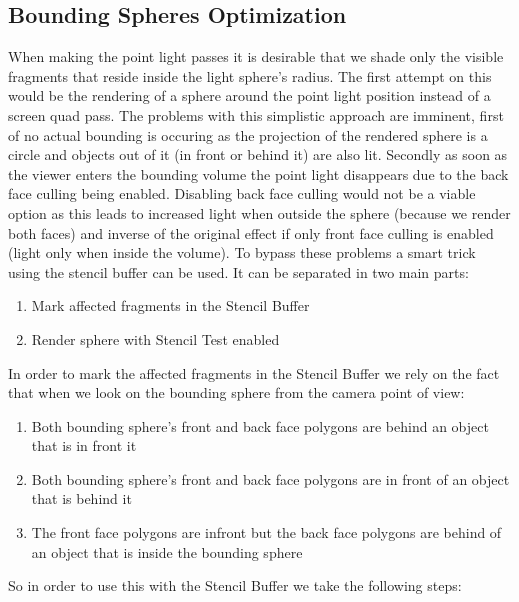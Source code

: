 \subsection{Bounding Spheres Optimization}

When making the point light passes it is desirable that we shade only the visible fragments that reside inside the light
sphere's radius. The first attempt on this would be the rendering of a sphere around the point light position instead
of a screen quad pass. The problems with this simplistic approach are imminent, first of no actual bounding is occuring
as the projection of the rendered sphere is a circle and objects out of it (in front or behind it) are also lit.
Secondly as soon as the viewer enters the bounding volume the point light disappears due to the back face culling
being enabled. Disabling back face culling would not be a viable option as this leads to increased light when outside
the sphere (because we render both faces) and inverse of the original effect if only front face culling is enabled (light
only when inside the volume).
To bypass these problems a smart trick using the stencil buffer can be used. It can be separated in two main parts:
\begin{enumerate}
    \item Mark affected fragments in the Stencil Buffer
    \item Render sphere with Stencil Test enabled
\end{enumerate}
In order to mark the affected fragments in the Stencil Buffer we rely on the fact that when we look on the bounding
sphere from the camera point of view:
\begin{enumerate}
    \item Both bounding sphere's front and back face polygons are behind an object that is in front it
    \item Both bounding sphere's front and back face polygons are in front of an object that is behind it
    \item The front face polygons are infront but the back face polygons are behind of an object that is inside the bounding sphere
\end{enumerate}
So in order to use this with the Stencil Buffer we take the following steps:
